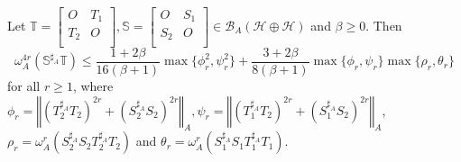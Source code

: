 \documentclass[10pt,a4paper]{amsart}
\newcommand {\Sa}{\mathbb{S}^{\sharp_{A}}}
\newcommand {\Soa}{S_{1}^{\sharp_{A}}}
\newcommand {\Sta}{S_{2}^{\sharp_{A}}}
\newcommand {\Toa}{T_{1}^{\sharp_{A}}}
\newcommand {\Tta}{T_{2}^{\sharp_{A}}}
\newcommand {\T}{\mathbb{T}}
\newcommand{\bra}[1]{\left(#1\right)}
\newcommand{\hh}{\mathcal{H}\oplus\mathcal{H}}
\newcommand{\normA}[1]{{\left\Vert#1\right\Vert}_{A}}
\renewcommand {\S}{\mathbb{S}}
\renewcommand {\b}{\mathcal{B}}
\begin{document}
 \begin{theorem}\label{Thm:prod1} Let $\T=\begin{bmatrix} O& T_1\\ T_2& O \\\end{bmatrix}, \S=\begin{bmatrix} O& S_1\\ S_2& O \\\end{bmatrix}\in\b_A(\hh)$ and $\beta\geq 0$. Then
 \begin{equation}\label{Eq:prod1}
 \omega_A^{4r}\bra{\Sa \T}\leq \frac{1+2\beta}{16(\beta+1)}\max\{\phi_r^2,\psi_r^2\}+\frac{3+2\beta}{8(\beta+1)}\max\{\phi_r,\psi_r\}
 \max\{\rho_r,\theta_r\}
 \end{equation}
 for all $r\geq 1$, where $\phi_r=\normA{\bra{\Tta T_2}^{2r}+\bra{\Sta S_2}^{2r}},\psi_r=\normA{\bra{\Toa T_2}^{2r}+\bra{\Soa S_2}^{2r}}$,
 $\rho_r=\omega_A^{r}\bra{\Sta S_2\Tta T_2}$ and $\theta_r=\omega_A^{r}\bra{\Soa S_1\Toa T_1}$.
 \end{theorem}
\end{document}
